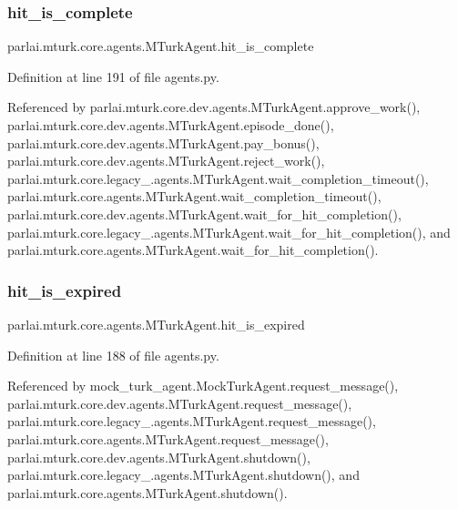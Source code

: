\subsubsection{\texorpdfstring{hit\+\_\+is\+\_\+complete}{hit\_is\_complete}}
{\footnotesize\ttfamily parlai.\+mturk.\+core.\+agents.\+M\+Turk\+Agent.\+hit\+\_\+is\+\_\+complete}



Definition at line 191 of file agents.\+py.



Referenced by parlai.\+mturk.\+core.\+dev.\+agents.\+M\+Turk\+Agent.\+approve\+\_\+work(), parlai.\+mturk.\+core.\+dev.\+agents.\+M\+Turk\+Agent.\+episode\+\_\+done(), parlai.\+mturk.\+core.\+dev.\+agents.\+M\+Turk\+Agent.\+pay\+\_\+bonus(), parlai.\+mturk.\+core.\+dev.\+agents.\+M\+Turk\+Agent.\+reject\+\_\+work(), parlai.\+mturk.\+core.\+legacy\+\_.\+agents.\+M\+Turk\+Agent.\+wait\+\_\+completion\+\_\+timeout(), parlai.\+mturk.\+core.\+agents.\+M\+Turk\+Agent.\+wait\+\_\+completion\+\_\+timeout(), parlai.\+mturk.\+core.\+dev.\+agents.\+M\+Turk\+Agent.\+wait\+\_\+for\+\_\+hit\+\_\+completion(), parlai.\+mturk.\+core.\+legacy\+\_.\+agents.\+M\+Turk\+Agent.\+wait\+\_\+for\+\_\+hit\+\_\+completion(), and parlai.\+mturk.\+core.\+agents.\+M\+Turk\+Agent.\+wait\+\_\+for\+\_\+hit\+\_\+completion().

\mbox{\label{classparlai_1_1mturk_1_1core_1_1agents_1_1MTurkAgent_ad5ef0e410b5e61c592d69dc4187037b2}} 
\subsubsection{\texorpdfstring{hit\+\_\+is\+\_\+expired}{hit\_is\_expired}}
{\footnotesize\ttfamily parlai.\+mturk.\+core.\+agents.\+M\+Turk\+Agent.\+hit\+\_\+is\+\_\+expired}



Definition at line 188 of file agents.\+py.



Referenced by mock\+\_\+turk\+\_\+agent.\+Mock\+Turk\+Agent.\+request\+\_\+message(), parlai.\+mturk.\+core.\+dev.\+agents.\+M\+Turk\+Agent.\+request\+\_\+message(), parlai.\+mturk.\+core.\+legacy\+\_.\+agents.\+M\+Turk\+Agent.\+request\+\_\+message(), parlai.\+mturk.\+core.\+agents.\+M\+Turk\+Agent.\+request\+\_\+message(), parlai.\+mturk.\+core.\+dev.\+agents.\+M\+Turk\+Agent.\+shutdown(), parlai.\+mturk.\+core.\+legacy\+\_.\+agents.\+M\+Turk\+Agent.\+shutdown(), and parlai.\+mturk.\+core.\+agents.\+M\+Turk\+Agent.\+shutdown().


